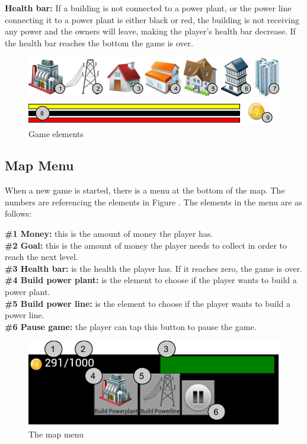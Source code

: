 	{\bf Health bar:} If a building is not connected to a power plant, or the power line connecting 
	it to a power plant is either black or red, the building is not receiving any power and the owners 
	will leave, making the player's health bar decrease. If the health bar reaches the bottom the game is over.

	\begin{figure}[H]
		\includegraphics[width=\textwidth]{pictures/GameElements.png}
		\caption{Game elements}
		\label{ref:gameelements}
	\end{figure}

\subsection*{Map Menu}
	When a new game is started, there is a menu at the bottom of the map. The numbers are referencing 
	the elements in Figure \label{fig:mapmenuelements}. The elements in the menu are as follows:

	{\bf \#1 Money:} this is the amount of money the player has. \\
	{\bf \#2 Goal: } this is the amount of money the player needs to collect in 
	order to reach the next level.\\
	{\bf \#3 Health bar: } is the health the player has. If it reaches zero, the game is over. \\
	{\bf \#4 Build power plant: } is the element to choose if the player wants to build a power plant. \\
	{\bf \#5 Build power line: } is the element to choose if the player wants to build a power line. \\
	{\bf \#6 Pause game: } the player can tap this button to pause the game. \\

	\begin{figure}[H]
		\includegraphics[width=\textwidth]{pictures/mapmenu.png}
		\caption{The map menu}
		\label{fig:mapmenuelements}
	\end{figure}

